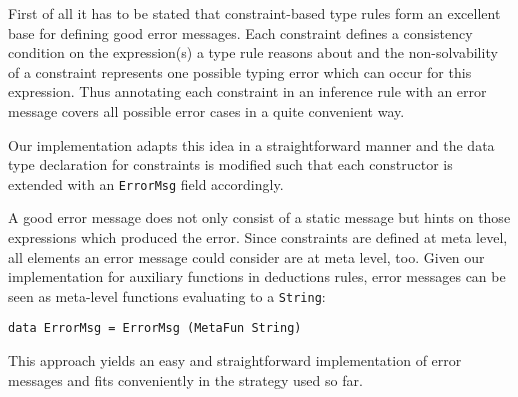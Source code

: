 First of all it has to be stated that constraint-based type rules
form an excellent base for defining good error messages. Each
constraint defines a consistency condition on the expression(s) a
type rule reasons about and the non-solvability of a constraint
represents one possible typing error which can occur for this
expression. Thus annotating each constraint in an inference rule with
an error message covers all possible error cases in a quite convenient
way.

Our implementation adapts this idea in a straightforward manner
and the data type declaration for constraints is modified such that
each constructor is extended with an \texttt{ErrorMsg} field
accordingly.

A good error message does not only consist of a static message but
hints on those expressions which produced the error. Since constraints
are defined at meta level, all elements an error message could
consider are at meta level, too. Given our implementation for
auxiliary functions in deductions rules, error messages can be seen as
meta-level functions evaluating to a \texttt{String}:
\begin{lstlisting}
data ErrorMsg = ErrorMsg (MetaFun String)
\end{lstlisting}
This approach yields an easy and straightforward implementation of
error messages and fits conveniently in the strategy used so far.